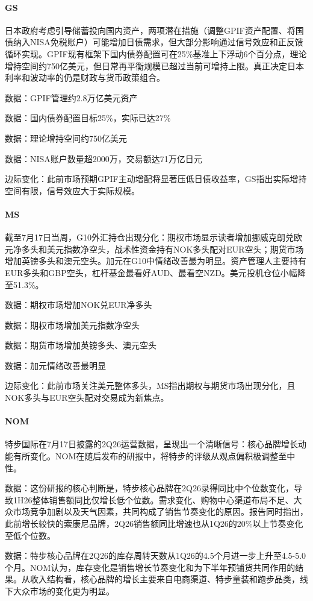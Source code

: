 \documentclass[11pt]{ctexart}
\begin{document}
\paragraph{GS} 日本政府考虑引导储蓄投向国内资产，两项潜在措施（调整GPIF资产配置、将国债纳入NISA免税账户）可能增加日债需求，但大部分影响通过信号效应和正反馈循环实现。GPIF现有框架下国内债券配置可在25\%基准上下浮动6个百分点，理论增持空间约750亿美元，但日常再平衡规模已超过当前可增持上限。真正决定日本利率和波动率的仍是财政与货币政策组合。
{\small\color{refgray}数据：GPIF管理约2.8万亿美元资产\par}
{\small\color{refgray}数据：国内债券配置目标25\%，实际已达27\%\par}
{\small\color{refgray}数据：理论增持空间约750亿美元\par}
{\small\color{refgray}数据：NISA账户数量超2000万，交易额达71万亿日元\par}
{\small\color{refgray}边际变化：此前市场预期GPIF主动增配将显著压低日债收益率，GS指出实际增持空间有限，信号效应大于实际规模。\par}
\paragraph{MS} 截至7月17日当周，G10外汇持仓出现分化：期权市场显示读者增加挪威克朗兑欧元净多头和美元指数净空头，战术性资金持有NOK多头配对EUR空头；期货市场增加英镑多头和澳元空头。加元在G10中情绪改善最为明显。资产管理人主要持有EUR多头和GBP空头，杠杆基金最看好AUD、最看空NZD。美元投机仓位小幅降至51.3\%。
{\small\color{refgray}数据：期权市场增加NOK兑EUR净多头\par}
{\small\color{refgray}数据：期权市场增加美元指数净空头\par}
{\small\color{refgray}数据：期货市场增加英镑多头、澳元空头\par}
{\small\color{refgray}数据：加元情绪改善最明显\par}
{\small\color{refgray}边际变化：此前市场关注美元整体多头，MS指出期权与期货市场出现分化，且NOK多头与EUR空头配对交易成为新焦点。\par}
\paragraph{NOM} 特步国际在7月17日披露的2Q26运营数据，呈现出一个清晰信号：核心品牌增长动能有所变化。NOM在随后发布的研报中，将特步的评级从观点偏积极调整至中性。
{\small\color{refgray}数据：这份研报的核心判断是，特步核心品牌在2Q26录得同比中个位数变化，导致1H26整体销售额同比仅增长低个位数。需求变化、购物中心渠道布局不足、大众市场竞争加剧以及天气因素，共同构成了销售节奏变化的原因。报告同时指出，此前增长较快的索康尼品牌，2Q26销售额同比增速也从1Q26的20\%以上节奏变化至低个位数。\par}
{\small\color{refgray}数据：特步核心品牌在2Q26的库存周转天数从1Q26的4.5个月进一步上升至4.5-5.0个月。NOM认为，库存变化是销售增长节奏变化和为下半年预铺货共同作用的结果。从收入结构看，核心品牌的增长主要来自电商渠道、特步童装和跑步品类，线下大众市场的变化更为明显。\par}
\end{document}
